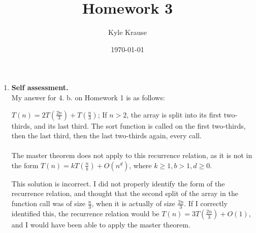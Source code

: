 \documentclass{article}
\title{Homework 3}
\author{Kyle Krause}
\date{\today}
\begin{document}
\maketitle

\begin{enumerate}
    \item \textbf{Self assessment.} \\
    My answer for 4. b. on Homework 1 is as follows: \\
    \begin{algorithm}
        $T(n) = 2T(\frac{2n}{3}) + T(\frac{n}{3})$; If $n>2$, the array is split into its first two-thirds, and its last third. The sort function is called on the first two-thirds, then the last third, then the last two-thirds again, every call. 
        \\\\
        The master theorem does not apply to this recurrence relation, as it is not in the form $T(n) = kT(\frac{n}{b}) + O(n^d)$, where $k \geq 1, b > 1, d \geq 0$.
    \end{algorithm}

    This solution is incorrect. I did not properly identify the form of the recurrence relation, and thought that the second split of the array in the function call was of size $\frac{n}{3}$, when it is actually of size $\frac{2n}{3}$. If I correctly identified this, the recurrence relation would be $T(n) = 3T(\frac{2n}{3}) + O(1)$, and I would have been able to apply the master theorem.



\end{enumerate}
\end{document}
